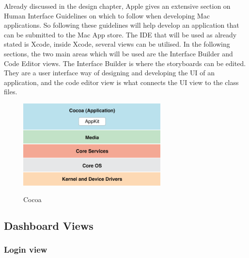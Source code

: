Already discussed in the design chapter, Apple gives an extensive section on Human Interface Guidelines on which to follow when developing Mac applications. So following these guidelines will help develop an application that can be submitted to the Mac App store. The IDE that will be used as already stated is Xcode, inside Xcode, several views can be utilised. In the following sections, the two main areas which will be used are the Interface Builder and Code Editor views. The Interface Builder is where the storyboards can be edited. They are a user interface way of designing and developing the UI of an application, and the code editor view is what connects the UI view to the class files.

\begin{figure}[!h]
    \caption{Cocoa \cite{cocoa}}
    \centering
    \includegraphics[width=75mm]{images/dashboard/cocoa}
    \label{fig:cocoa}
\end{figure}

\subsection{Dashboard Views}

\subsubsection{Login view}


